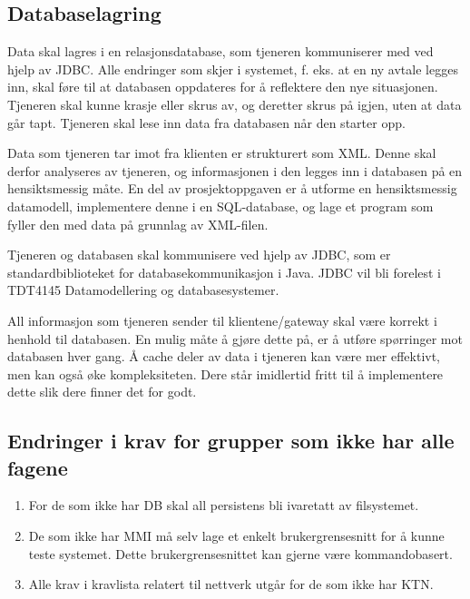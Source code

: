 \subsection{Databaselagring}

Data skal lagres i en relasjonsdatabase, som tjeneren kommuniserer med ved hjelp av JDBC. Alle endringer som skjer i systemet, f. eks. at  en ny avtale legges inn, skal føre til at databasen oppdateres for å reflektere den nye situasjonen. Tjeneren skal kunne krasje eller skrus av, og deretter skrus på igjen, uten at data går tapt. Tjeneren skal lese inn data fra databasen når den starter opp.

Data som tjeneren tar imot fra klienten er strukturert som XML. Denne skal derfor analyseres av tjeneren, og informasjonen i den legges inn i databasen på en hensiktsmessig måte. En del av prosjektoppgaven er å utforme en hensiktsmessig datamodell, implementere denne i en SQL-database, og lage et program som fyller den med data på grunnlag av XML-filen. 

Tjeneren og databasen skal kommunisere ved hjelp av JDBC, som er standardbiblioteket for databasekommunikasjon i Java. JDBC vil bli forelest i TDT4145 Datamodellering og databasesystemer.

All informasjon som tjeneren sender til klientene/gateway skal være korrekt i henhold til databasen. En mulig måte å gjøre dette på, er å utføre spørringer mot databasen hver gang. Å cache deler av data i tjeneren kan være mer effektivt, men kan også øke kompleksiteten. Dere står imidlertid fritt til å implementere dette slik dere finner det for godt.

\subsection{Endringer i krav for grupper som ikke har alle fagene}

\begin{enumerate}

\item
For de som ikke har DB skal all persistens bli ivaretatt av filsystemet. 

\item
De som ikke har MMI må selv lage et enkelt brukergrensesnitt for å kunne teste systemet. Dette brukergrensesnittet kan gjerne være kommandobasert. 

\item
Alle krav i kravlista relatert til nettverk utgår for de som ikke har KTN. 

\end{enumerate}

